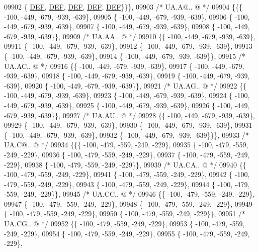 \begin{DoxyCode}
09902 \{  \mbox{\hyperlink{1_88_84__epars_8h_a397419fc12b37ed479c8abb9d444d843}{DEF}},  \mbox{\hyperlink{1_88_84__epars_8h_a397419fc12b37ed479c8abb9d444d843}{DEF}},  \mbox{\hyperlink{1_88_84__epars_8h_a397419fc12b37ed479c8abb9d444d843}{DEF}},  \mbox{\hyperlink{1_88_84__epars_8h_a397419fc12b37ed479c8abb9d444d843}{DEF}},  \mbox{\hyperlink{1_88_84__epars_8h_a397419fc12b37ed479c8abb9d444d843}{DEF}}\}\}\},
09903 \textcolor{comment}{/* UA.A@.. @ */}
09904 \{\{\{ -100, -449, -679, -939, -639\},
09905 \{ -100, -449, -679, -939, -639\},
09906 \{ -100, -449, -679, -939, -639\},
09907 \{ -100, -449, -679, -939, -639\},
09908 \{ -100, -449, -679, -939, -639\}\},
09909 \textcolor{comment}{/* UA.AA.. @ */}
09910 \{\{ -100, -449, -679, -939, -639\},
09911 \{ -100, -449, -679, -939, -639\},
09912 \{ -100, -449, -679, -939, -639\},
09913 \{ -100, -449, -679, -939, -639\},
09914 \{ -100, -449, -679, -939, -639\}\},
09915 \textcolor{comment}{/* UA.AC.. @ */}
09916 \{\{ -100, -449, -679, -939, -639\},
09917 \{ -100, -449, -679, -939, -639\},
09918 \{ -100, -449, -679, -939, -639\},
09919 \{ -100, -449, -679, -939, -639\},
09920 \{ -100, -449, -679, -939, -639\}\},
09921 \textcolor{comment}{/* UA.AG.. @ */}
09922 \{\{ -100, -449, -679, -939, -639\},
09923 \{ -100, -449, -679, -939, -639\},
09924 \{ -100, -449, -679, -939, -639\},
09925 \{ -100, -449, -679, -939, -639\},
09926 \{ -100, -449, -679, -939, -639\}\},
09927 \textcolor{comment}{/* UA.AU.. @ */}
09928 \{\{ -100, -449, -679, -939, -639\},
09929 \{ -100, -449, -679, -939, -639\},
09930 \{ -100, -449, -679, -939, -639\},
09931 \{ -100, -449, -679, -939, -639\},
09932 \{ -100, -449, -679, -939, -639\}\}\},
09933 \textcolor{comment}{/* UA.C@.. @ */}
09934 \{\{\{ -100, -479, -559, -249, -229\},
09935 \{ -100, -479, -559, -249, -229\},
09936 \{ -100, -479, -559, -249, -229\},
09937 \{ -100, -479, -559, -249, -229\},
09938 \{ -100, -479, -559, -249, -229\}\},
09939 \textcolor{comment}{/* UA.CA.. @ */}
09940 \{\{ -100, -479, -559, -249, -229\},
09941 \{ -100, -479, -559, -249, -229\},
09942 \{ -100, -479, -559, -249, -229\},
09943 \{ -100, -479, -559, -249, -229\},
09944 \{ -100, -479, -559, -249, -229\}\},
09945 \textcolor{comment}{/* UA.CC.. @ */}
09946 \{\{ -100, -479, -559, -249, -229\},
09947 \{ -100, -479, -559, -249, -229\},
09948 \{ -100, -479, -559, -249, -229\},
09949 \{ -100, -479, -559, -249, -229\},
09950 \{ -100, -479, -559, -249, -229\}\},
09951 \textcolor{comment}{/* UA.CG.. @ */}
09952 \{\{ -100, -479, -559, -249, -229\},
09953 \{ -100, -479, -559, -249, -229\},
09954 \{ -100, -479, -559, -249, -229\},
09955 \{ -100, -479, -559, -249, -229\},

\end{DoxyCode}
